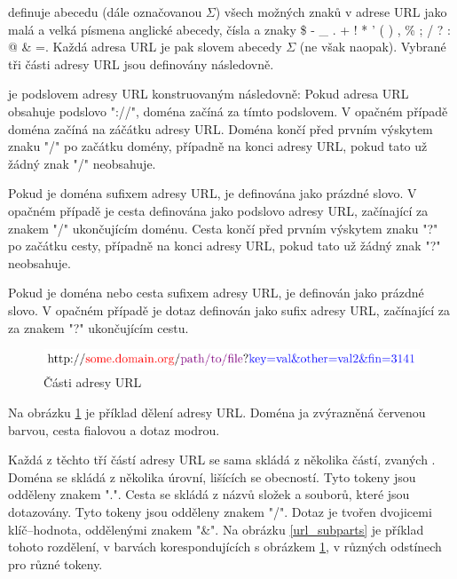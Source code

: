 \cite{berners-lee_uniform_1994} definuje abecedu (dále označovanou \( \Sigma \)) všech možných znaků v adrese URL jako malá a velká písmena anglické abecedy, čísla a znaky \$ - \_ . + ! * ' ( ) , \% ; / ? : @ \& =. Každá adresa URL je pak slovem abecedy \( \Sigma \) (ne však naopak). Vybrané tři části adresy URL jsou definovány následovně.
\begin{define}
	 je podslovem adresy URL konstruovaným následovně: Pokud adresa URL obsahuje podslovo "://", doména začíná za tímto podslovem. V opačném případě doména začíná na záčátku adresy URL. Doména končí před prvním výskytem znaku "/" po začátku domény, případně na konci adresy URL, pokud tato už žádný znak "/" neobsahuje.
\end{define}
\begin{define}
	Pokud je doména sufixem adresy URL, je  definována jako prázdné slovo. V opačném případě je cesta definována jako podslovo adresy URL, začínající za znakem "/" ukončujícím doménu. Cesta končí před prvním výskytem znaku "?" po začátku cesty, případně na konci adresy URL, pokud tato už žádný znak "?" neobsahuje.
\end{define}
\begin{define}
	Pokud je doména nebo cesta sufixem adresy URL, je  definován jako prázdné slovo. V opačném případě je dotaz definován jako sufix adresy URL, začínající za za znakem "?" ukončujícím cestu.
\end{define}

\begin{figure}[h]
	\centering
	\includegraphics{images/url_parts/url_parts.pdf}
	\caption{Části adresy URL}\label{url_parts}
\end{figure}

Na obrázku \ref{url_parts} je příklad dělení adresy URL. Doména ja zvýrazněná červenou barvou, cesta fialovou a dotaz modrou.

Každá z těchto tří částí adresy URL se sama skládá z několika částí, zvaných . Doména se skládá z několika úrovní, lišících se obecností. Tyto tokeny jsou odděleny znakem ".". Cesta se skládá z názvů složek a souborů, které jsou dotazovány. Tyto tokeny jsou odděleny znakem "/". Dotaz je tvořen dvojicemi klíč--hodnota, oddělenými znakem "\&". Na obrázku \ref{url_subparts} je příklad tohoto rozdělení, v barvách korespondujících s obrázkem \ref{url_parts}, v různých odstínech pro různé tokeny.

